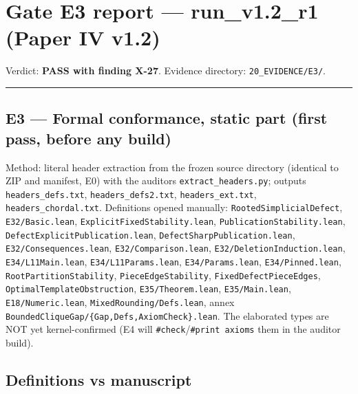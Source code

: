 \documentclass[
]{article}
\author{}
\date{}
\begin{document}
\section{Gate E3 report --- run\_v1.2\_r1 (Paper IV
v1.2)}\label{gate-e3-report--run_v12_r1-paper-iv-v12}

Verdict: \textbf{PASS with finding X-27}. Evidence directory:
\texttt{20\_EVIDENCE/E3/}.

\begin{center}\rule{0.5\linewidth}{0.5pt}\end{center}

\subsection{E3 --- Formal conformance, static part (first pass, before
any
build)}\label{e3--formal-conformance-static-part-first-pass-before-any-build}

Method: literal header extraction from the frozen source directory
(identical to ZIP and manifest, E0) with the auditor\textquotesingle s
\texttt{extract\_headers.py}; outputs \texttt{headers\_defs.txt},
\texttt{headers\_defs2.txt}, \texttt{headers\_ext.txt},
\texttt{headers\_chordal.txt}. Definitions opened manually:
\texttt{RootedSimplicialDefect}, \texttt{E32/Basic.lean},
\texttt{ExplicitFixedStability.lean},
\texttt{PublicationStability.lean},
\texttt{DefectExplicitPublication.lean},
\texttt{DefectSharpPublication.lean}, \texttt{E32/Consequences.lean},
\texttt{E32/Comparison.lean}, \texttt{E32/DeletionInduction.lean},
\texttt{E34/L11Main.lean}, \texttt{E34/L11Params.lean},
\texttt{E34/Params.lean}, \texttt{E34/Pinned.lean},
\texttt{RootPartitionStability}, \texttt{PieceEdgeStability},
\texttt{FixedDefectPieceEdges}, \texttt{OptimalTemplateObstruction},
\texttt{E35/Theorem.lean}, \texttt{E35/Main.lean},
\texttt{E18/Numeric.lean}, \texttt{MixedRounding/Defs.lean}, annex
\texttt{BoundedCliqueGap/\{Gap,Defs,AxiomCheck\}.lean}. The elaborated
types are NOT yet kernel-confirmed (E4 will
\texttt{\#check}/\texttt{\#print\ axioms} them in the auditor build).

\subsection{Definitions vs manuscript}\label{definitions-vs-manuscript}
\end{document}
